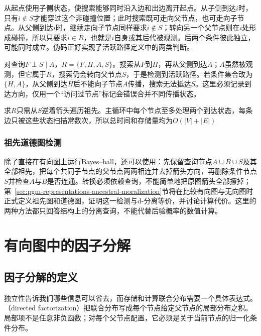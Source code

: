 从起点使用子侧状态，使搜索能够同时沿入边和出边离开起点。从子侧到达$i$时，只有$i\notin S$才能穿过这个非碰撞位置；此时搜索既可走向父节点，也可走向子节点。从父侧到达$i$时，继续走向子节点同样要求$i\notin S$；转向另一个父节点则在$i$处形成碰撞，所以只要求$i\in R$，也就是$i$自身或其后代被观测。后两个条件彼此独立，可能同时成立。伪码正好实现了活跃路径定义中的两类判断。

对查询$F\perp S\mid A$，$R=\{F,H,A,S\}$。搜索从$F$到$H$，再从父侧到达$A$；$A$虽然被观测，但它属于$R$，搜索仍会转向父节点$S$，于是检测到活跃路径。若条件集合改为$\{H,A\}$，从父侧到达$H$后不能向子节点$A$传播，搜索无法抵达$S$。这里必须记录到达方向，仅用一个“访问过节点”标记会错误合并不同传播状态。

求$R$只需从$S$逆着箭头遍历祖先。主循环中每个节点至多处理两个到达状态，每条边只被这些状态扫描常数次，所以总时间和存储量均为$O(|V|+|E|)$

\subsubsection{祖先道德图检测}
\label{sec:pgm-directed-ancestral-moral-test}
\label{sec:pgm-directed-undirected-test}

除了直接在有向图上运行Bayes--ball，还可以使用：先保留查询节点$A\cup B\cup S$及其全部祖先，把每个共同子节点的父节点两两相连并去掉箭头方向，再删除条件节点$S$并检查$A$与$B$是否连通。转换必须依赖查询，不能简单地把原图箭头全部擦掉；第~\ref{sec:pgm-representations-ancestral-moralization}节将在比较有向图与无向图时正式定义祖先图和道德图，证明这一检测与d-分离等价，并讨论计算代价。这里的两种方法都只回答结构上的分离查询，不能代替后验概率的数值计算。

\endgroup

\section{有向图中的因子分解}
\label{sec:pgm-directed-factorization}

\subsection{因子分解的定义}
\label{sec:pgm-directed-factor-definition}

独立性告诉我们哪些信息可以省去，而存储和计算联合分布需要一个具体表达式。（directed factorization）把联合分布写成每个节点给定父节点的局部分布之积。局部项不是任意非负函数；对每个父节点配置，它必须是关于当前节点的归一化条件分布。

